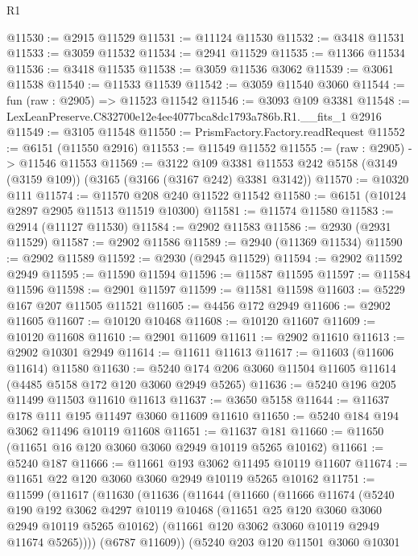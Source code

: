 \begin{lexlean}{R1}
\begin{coremodule}
@11530 := @2915 @11529
@11531 := @11124 @11530
@11532 := @3418 @11531
@11533 := @3059 @11532
@11534 := @2941 @11529
@11535 := @11366 @11534
@11536 := @3418 @11535
@11538 := @3059 @11536 @3062
@11539 := @3061 @11538
@11540 := @11533 @11539
@11542 := @3059 @11540 @3060
@11544 := fun (raw : @2905) => @11523 @11542
@11546 := @3093 @109 @3381
@11548 := LexLeanPreserve.C832700e12e4ee4077bca8dc1793a786b.R1.__fits_1 @2916
@11549 := @3105 @11548
@11550 := PrismFactory.Factory.readRequest
@11552 := @6151 (@11550 @2916)
@11553 := @11549 @11552
@11555 := (raw : @2905) -> @11546 @11553
@11569 := @3122
    @109
    @3381
    @11553
    @242
    @5158
    (@3149 (@3159 @109))
    (@3165 (@3166 (@3167 @242) @3381 @3142))
@11570 := @10320 @111
@11574 := @11570 @208 @240 @11522 @11542
@11580 := @6151 (@10124 @2897 @2905 @11513 @11519 @10300)
@11581 := @11574 @11580
@11583 := @2914 (@11127 @11530)
@11584 := @2902 @11583
@11586 := @2930 (@2931 @11529)
@11587 := @2902 @11586
@11589 := @2940 (@11369 @11534)
@11590 := @2902 @11589
@11592 := @2930 (@2945 @11529)
@11594 := @2902 @11592 @2949
@11595 := @11590 @11594
@11596 := @11587 @11595
@11597 := @11584 @11596
@11598 := @2901 @11597
@11599 := @11581 @11598
@11603 := @5229 @167 @207 @11505 @11521
@11605 := @4456 @172 @2949
@11606 := @2902 @11605
@11607 := @10120 @10468
@11608 := @10120 @11607
@11609 := @10120 @11608
@11610 := @2901 @11609
@11611 := @2902 @11610
@11613 := @2902 @10301 @2949
@11614 := @11611 @11613
@11617 := @11603 (@11606 @11614) @11580
@11630 := @5240 @174 @206 @3060 @11504 @11605 @11614 (@4485 @5158 @172 @120 @3060 @2949 @5265)
@11636 := @5240 @196 @205 @11499 @11503 @11610 @11613
@11637 := @3650 @5158
@11644 := @11637 @178 @111 @195 @11497 @3060 @11609 @11610
@11650 := @5240 @184 @194 @3062 @11496 @10119 @11608
@11651 := @11637 @181
@11660 := @11650 (@11651 @16 @120 @3060 @3060 @2949 @10119 @5265 @10162)
@11661 := @5240 @187
@11666 := @11661 @193 @3062 @11495 @10119 @11607
@11674 := @11651 @22 @120 @3060 @3060 @2949 @10119 @5265 @10162
@11751 := @11599
    (@11617
      (@11630
        (@11636
          (@11644
            (@11660
              (@11666
                @11674
                (@5240
                  @190
                  @192
                  @3062
                  @4297
                  @10119
                  @10468
                  (@11651 @25 @120 @3060 @3060 @2949 @10119 @5265 @10162)
                  (@11661 @120 @3062 @3060 @10119 @2949 @11674 @5265))))
            (@6787 @11609))
          (@5240
            @203
            @120
            @11501
            @3060
            @10301

\end{coremodule}
\end{lexlean}
